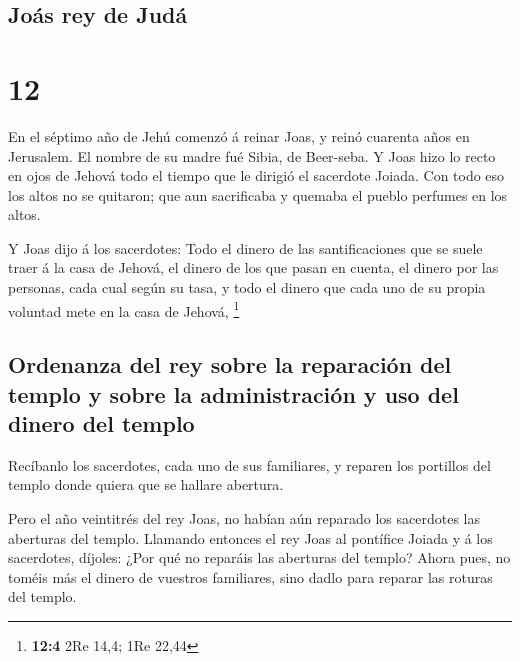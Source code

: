 \hypertarget{jouxe1s-rey-de-juduxe1}{%
\subsection{Joás rey de Judá}\label{jouxe1s-rey-de-juduxe1}}

\hypertarget{section-11}{%
\section{12}\label{section-11}}

 En el séptimo año de Jehú comenzó á reinar Joas, y reinó
cuarenta años en Jerusalem. El nombre de su madre fué Sibia, de
Beer-seba.  Y Joas hizo lo recto en ojos de Jehová todo el
tiempo que le dirigió el sacerdote Joiada.  Con todo eso los
altos no se quitaron; que aun sacrificaba y quemaba el pueblo perfumes
en los altos.

 Y Joas dijo á los sacerdotes: Todo el dinero de las
santificaciones que se suele traer á la casa de Jehová, el dinero de los
que pasan en cuenta, el dinero por las personas, cada cual según su
tasa, y todo el dinero que cada uno de su propia voluntad mete en la
casa de Jehová, \footnote{\textbf{12:4} 2Re 14,4; 1Re 22,44}

\hypertarget{ordenanza-del-rey-sobre-la-reparaciuxf3n-del-templo-y-sobre-la-administraciuxf3n-y-uso-del-dinero-del-templo}{%
\subsection{Ordenanza del rey sobre la reparación del templo y sobre la
administración y uso del dinero del
templo}\label{ordenanza-del-rey-sobre-la-reparaciuxf3n-del-templo-y-sobre-la-administraciuxf3n-y-uso-del-dinero-del-templo}}

 Recíbanlo los sacerdotes, cada uno de sus familiares, y
reparen los portillos del templo donde quiera que se hallare abertura.

 Pero el año veintitrés del rey Joas, no habían aún reparado
los sacerdotes las aberturas del templo.  Llamando entonces
el rey Joas al pontífice Joiada y á los sacerdotes, díjoles: ¿Por qué no
reparáis las aberturas del templo? Ahora pues, no toméis más el dinero
de vuestros familiares, sino dadlo para reparar las roturas del templo.

